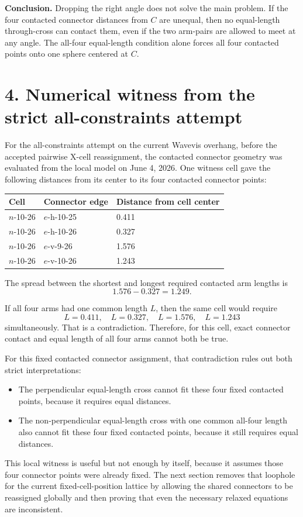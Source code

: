 \documentclass[11pt,letterpaper]{article}
\begin{document}
\textbf{Conclusion.} Dropping the right angle does not solve the main problem. If the four contacted connector distances from \(C\) are unequal, then no equal-length through-cross can contact them, even if the two arm-pairs are allowed to meet at any angle. The all-four equal-length condition alone forces all four contacted points onto one sphere centered at \(C\).

\section*{4. Numerical witness from the strict all-constraints attempt}

For the all-constraints attempt on the current Wavevis overhang, before the accepted pairwise X-cell reassignment, the contacted connector geometry was evaluated from the local model on June 4, 2026. One witness cell gave the following distances from its center to its four contacted connector points:

\begin{center}
\begin{tabular}{lll}
\toprule
Cell & Connector edge & Distance from cell center \\
\midrule
\(n\)-10-26 & \(e\)-h-10-25 & 0.411 \\
\(n\)-10-26 & \(e\)-h-10-26 & 0.327 \\
\(n\)-10-26 & \(e\)-v-9-26  & 1.576 \\
\(n\)-10-26 & \(e\)-v-10-26 & 1.243 \\
\bottomrule
\end{tabular}
\end{center}

The spread between the shortest and longest required contacted arm lengths is
\[
1.576-0.327=1.249.
\]

If all four arms had one common length \(L\), then the same cell would require
\[
L=0.411,\quad L=0.327,\quad L=1.576,\quad L=1.243
\]
simultaneously. That is a contradiction. Therefore, for this cell, exact connector contact and equal length of all four arms cannot both be true.

For this fixed contacted connector assignment, that contradiction rules out both strict interpretations:
\begin{itemize}
  \item The perpendicular equal-length cross cannot fit these four fixed contacted points, because it requires equal distances.
  \item The non-perpendicular equal-length cross with one common all-four length also cannot fit these four fixed contacted points, because it still requires equal distances.
\end{itemize}
This local witness is useful but not enough by itself, because it assumes those four connector points were already fixed. The next section removes that loophole for the current fixed-cell-position lattice by allowing the shared connectors to be reassigned globally and then proving that even the necessary relaxed equations are inconsistent.
\end{document}

